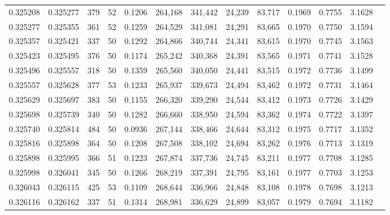 \begin{tabular}{rrrrrrrrrrrrr}
0.325208 & 0.325277 &   379 &  52 &                                     0.1206 & 264,168 & 341,442 &  24,239 &  83,717 & 0.1969 & 0.7755 & 3.1628 \\
0.325277 & 0.325355 &   361 &  52 &                                     0.1259 & 264,529 & 341,081 &  24,291 &  83,665 & 0.1970 & 0.7750 & 3.1594 \\
0.325357 & 0.325421 &   337 &  50 &                                     0.1292 & 264,866 & 340,744 &  24,341 &  83,615 & 0.1970 & 0.7745 & 3.1563 \\
0.325423 & 0.325495 &   376 &  50 &                                     0.1174 & 265,242 & 340,368 &  24,391 &  83,565 & 0.1971 & 0.7741 & 3.1528 \\
0.325496 & 0.325557 &   318 &  50 &                                     0.1359 & 265,560 & 340,050 &  24,441 &  83,515 & 0.1972 & 0.7736 & 3.1499 \\
0.325557 & 0.325628 &   377 &  53 &                                     0.1233 & 265,937 & 339,673 &  24,494 &  83,462 & 0.1972 & 0.7731 & 3.1464 \\
0.325629 & 0.325697 &   383 &  50 &                                     0.1155 & 266,320 & 339,290 &  24,544 &  83,412 & 0.1973 & 0.7726 & 3.1429 \\
0.325698 & 0.325739 &   340 &  50 &                                     0.1282 & 266,660 & 338,950 &  24,594 &  83,362 & 0.1974 & 0.7722 & 3.1397 \\
0.325740 & 0.325814 &   484 &  50 &                                     0.0936 & 267,144 & 338,466 &  24,644 &  83,312 & 0.1975 & 0.7717 & 3.1352 \\
0.325816 & 0.325898 &   364 &  50 &                                     0.1208 & 267,508 & 338,102 &  24,694 &  83,262 & 0.1976 & 0.7713 & 3.1319 \\
0.325898 & 0.325995 &   366 &  51 &                                     0.1223 & 267,874 & 337,736 &  24,745 &  83,211 & 0.1977 & 0.7708 & 3.1285 \\
0.325998 & 0.326041 &   345 &  50 &                                     0.1266 & 268,219 & 337,391 &  24,795 &  83,161 & 0.1977 & 0.7703 & 3.1253 \\
0.326043 & 0.326115 &   425 &  53 &                                     0.1109 & 268,644 & 336,966 &  24,848 &  83,108 & 0.1978 & 0.7698 & 3.1213 \\
0.326116 & 0.326162 &   337 &  51 &                                     0.1314 & 268,981 & 336,629 &  24,899 &  83,057 & 0.1979 & 0.7694 & 3.1182 \\

\end{tabular}
